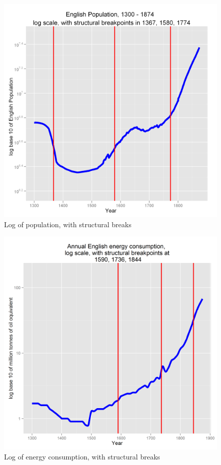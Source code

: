 \documentclass[final]{beamer}
\begin{document}
\begin{frame}
\begin{figure}[p!]
\center
\caption{Log of population, with structural breaks}
\label{fig:popLog}
\includegraphics[height=0.8\textheight]{popLog}
\end{figure}
\end{frame}

\begin{frame}
\begin{figure}[p!]
\center
\caption{Log of energy consumption, with structural breaks}
\label{fig:energyLog}
\includegraphics[height=0.8\textheight]{energyLog1.png}
\end{figure}
\end{frame}
\end{document}
